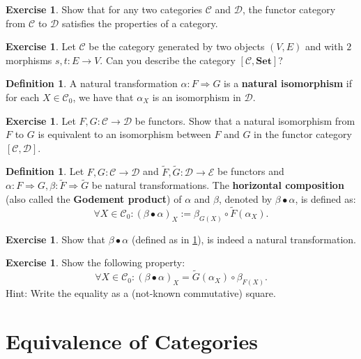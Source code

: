 \documentclass[a4paper,11pt, oneside,titlepage=false]{scrbook}
\theoremstyle{plain}
\theoremstyle{definition}
\newtheorem{dfn}[thm]{Definition}
\newtheorem{exer}[thm]{Exercise}
\newcommand{\Cat}[1]{\mathcal{#1}}
\newcommand{\CC}{\Cat{C}}
\newcommand{\DD}{\Cat{D}}
\newcommand{\EE}{\Cat{E}}
\newcommand{\Catb}[1]{\mathbf{#1}}
\newcommand{\SET}{\Catb{Set}}
\newcommand{\Ob}[1]{{#1}_0}
\newcommand{\NatTrans}[3]{#1 : #2 \Rightarrow #3}
\newcommand{\co}[2]{\ensuremath{#2 \circ #1}}
\begin{document}
\begin{exer} Show that for any two categories $\CC$ and $\DD$, the functor category from $\CC$ to $\DD$ satisfies the properties of a category.
\end{exer}

\begin{exer}
Let $\CC$ be the category generated by two objects $(V, E)$ and with $2$ morphisms $s, t : E \to V$.
Can you describe the category $[\CC, \SET]$?
\end{exer}

\begin{dfn}
A natural transformation $\alpha : F \Rightarrow G$ is a \textbf{natural isomorphism} if for each $X\in\Ob{\CC}$, we have that $\alpha_X$ is an isomorphism in $\DD$.
\end{dfn}

\begin{exer}
Let $F, G : \CC \to \DD$ be functors.
Show that a natural isomorphism from $F$ to $G$ is equivalent to an isomorphism between $F$ and $G$ in the functor category $[\CC, \DD]$.
\end{exer}

\begin{dfn}\label{dfn:nattrans_horcomp} Let $F,G : \CC\to\DD$ and $\tilde{F},\tilde{G}:\DD\to\EE$ be functors and $\NatTrans{\alpha}{F}{G}, \NatTrans{\beta}{\tilde{F}}{\tilde{G}}$ be natural transformations. The \textbf{horizontal composition} (also called the \textbf{Godement product}) of $\alpha$ and $\beta$, denoted by $\beta \bullet \alpha$, is defined as:
\begin{equation}\label{eqn:nattrans_horcomp}
\forall X\in \Ob{\CC}: (\beta\bullet\alpha)_X := \co{\tilde{F}(\alpha_X)}{\beta_{G(X)}}.
\end{equation}
\end{dfn}

\begin{exer} Show that $\beta\bullet\alpha$ (defined as in \cref{dfn:nattrans_horcomp}), is indeed a natural transformation.
\end{exer}

\begin{exer} Show the following property:
\[
\forall X\in \Ob{\CC}: (\beta\bullet\alpha)_X = \co{\beta_{F(X)}}{\tilde{G}(\alpha_X)}.
\]
Hint: Write the equality as a (not-known commutative) square.
\end{exer}

\section{Equivalence of Categories}
\end{document}
